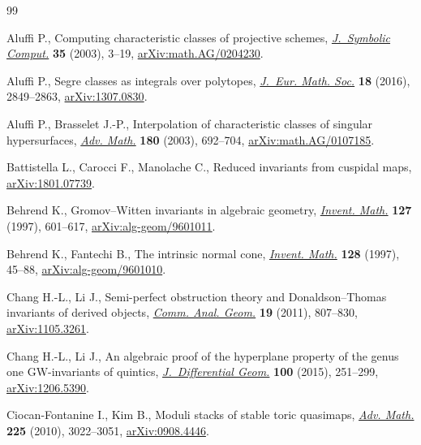 \documentclass[pdftex]{sigma}
\numberwithin{equation}{section}
\theoremstyle{plain}
\theoremstyle{definition}
\theoremstyle{remark}
\begin{document}
\begin{thebibliography}{99}
\footnotesize\itemsep=0pt

Aluffi P., Computing characteristic classes of projective schemes,
 \href{https://doi.org/10.1016/S0747-7171(02)00089-5}{\textit{J.~Symbolic Comput.}} \textbf{35} (2003), 3--19,
 \href{https://arxiv.org/abs/math.AG/0204230}{arXiv:math.AG/0204230}.

Aluffi P., Segre classes as integrals over polytopes, \href{https://doi.org/10.4171/JEMS/655}{\textit{J.~Eur. Math.
 Soc.}} \textbf{18} (2016), 2849--2863, \href{https://arxiv.org/abs/1307.0830}{arXiv:1307.0830}.

Aluffi P., Brasselet J.-P., Interpolation of characteristic classes of singular
 hypersurfaces, \href{https://doi.org/10.1016/S0001-8708(03)00017-3}{\textit{Adv. Math.}} \textbf{180} (2003), 692--704, \href{https://arxiv.org/abs/math.AG/0107185}{arXiv:math.AG/0107185}.

Battistella L., Carocci F., Manolache C., Reduced invariants from cuspidal
 maps, \href{https://arxiv.org/abs/1801.07739}{arXiv:1801.07739}.

Behrend K., Gromov--{W}itten invariants in algebraic geometry, \href{https://doi.org/10.1007/s002220050132}{\textit{Invent.
 Math.}} \textbf{127} (1997), 601--617, \href{https://arxiv.org/abs/alg-geom/9601011}{arXiv:alg-geom/9601011}.

Behrend K., Fantechi B., The intrinsic normal cone, \href{https://doi.org/10.1007/s002220050136}{\textit{Invent. Math.}}
 \textbf{128} (1997), 45--88, \href{https://arxiv.org/abs/alg-geom/9601010}{arXiv:alg-geom/9601010}.

Chang H.-L., Li J., Semi-perfect obstruction theory and {D}onaldson--{T}homas
 invariants of derived objects, \href{https://doi.org/10.4310/CAG.2011.v19.n4.a6}{\textit{Comm. Anal. Geom.}} \textbf{19} (2011),
 807--830, \href{https://arxiv.org/abs/1105.3261}{arXiv:1105.3261}.

Chang H.-L., Li J., An algebraic proof of the hyperplane property of the genus
 one {GW}-invariants of quintics, \href{https://doi.org/10.4310/jdg/1430744122}{\textit{J.~Differential Geom.}} \textbf{100}
 (2015), 251--299, \href{https://arxiv.org/abs/1206.5390}{arXiv:1206.5390}.

Ciocan-Fontanine I., Kim B., Moduli stacks of stable toric quasimaps,
 \href{https://doi.org/10.1016/j.aim.2010.05.023}{\textit{Adv. Math.}} \textbf{225} (2010), 3022--3051, \href{https://arxiv.org/abs/0908.4446}{arXiv:0908.4446}.


\end{thebibliography}
\end{document}
